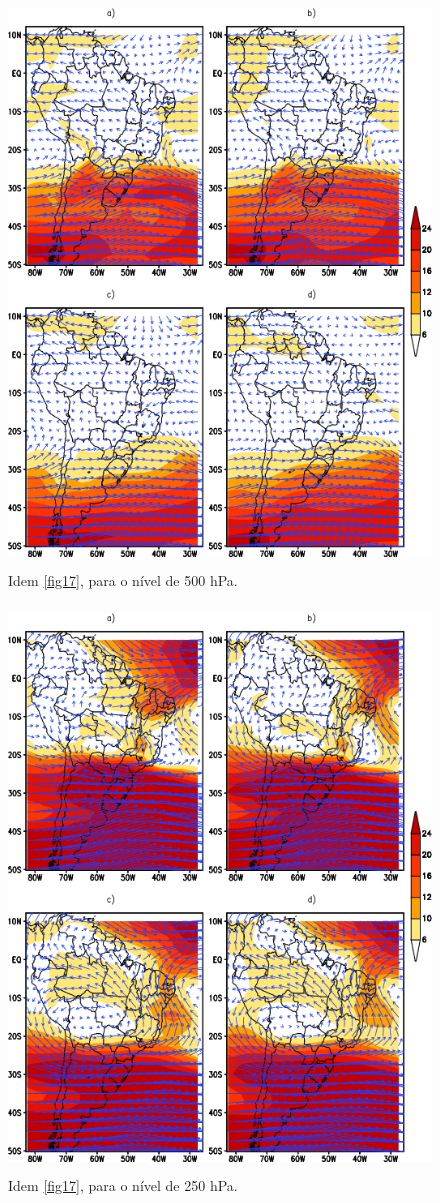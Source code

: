 \begin{figure}[!hbp]
\centering
\includegraphics[height=15cm]{./figs/media_ventos_anl_500hPa.png}
\caption{Idem \autoref{fig17}, para o nível de 500 hPa.}
\label{fig18}
\end{figure}

\begin{figure}[!hbp]
\centering
\includegraphics[height=15cm]{./figs/media_ventos_anl_250hPa.png}
\caption{Idem \autoref{fig17}, para o nível de 250 hPa.}
\label{fig19}
\end{figure}

